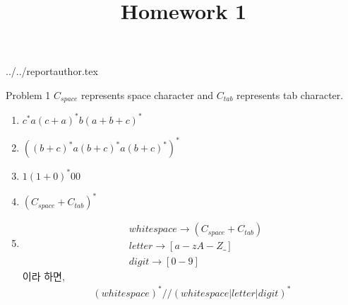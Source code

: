 \documentclass {article}
\begin{document}
\title {Homework 1}
 {../../reportauthor.tex}
\maketitle

Problem 1\newline
\indent $C_{space}$ represents space character and $C_{tab}$ represents tab character.
\begin{enumerate}
\item $c^*a(c+a)^*b(a+b+c)^*$
\item $((b+c)^*a(b+c)^*a(b+c)^*)^*$
\item $1(1+0)^*00$
\item $(C_{space} + C_{tab})^*$
\item \begin{align*}
  &whitespace \rightarrow (C_{space} + C_{tab}) \\
  &letter \rightarrow [a-zA-Z\_] \\
  &digit \rightarrow [0-9]
\end{align*}
  이라 하면,
  \begin{align*}
    (whitespace)^*//(whitespace|letter|digit)^*
  \end{align*}
\end{enumerate}
\end{document}
